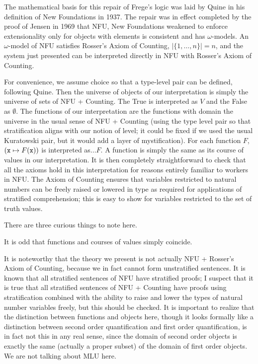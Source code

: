 \documentclass[12pt]{article}
\begin{document}
The mathematical basis for this repair of Frege's logic was laid by Quine in his definition of New Foundations in 1937.  The repair was in effect completed by the proof of Jensen in 1969 that NFU, New Foundations weakened to enforce extensionality only for objects with elements is consistent and has $\omega$-models.  An $\omega$-model of NFU satisfies Rosser's Axiom of Counting, $|\{1,\ldots,n\}| = n$, and the system just
presented can be interpreted directly in NFU with Rosser's Axiom of Counting.

For convenience, we assume choice so that a type-level pair can be defined, following Quine.  Then the universe of objects of our interpretation is simply the universe of sets of NFU + Counting.   The True is interpreted as $V$ and the False as $\emptyset$.  The functions of our interpretation are the functions with domain the universe in the usual sense of NFU + Counting (using the type level pair so that stratification aligns with our notion of level;  it could be fixed if we used the usual Kuratowski pair, but it would add a layer of mystification).
For each function $F$, $({\tt x} \mapsto F({\tt x}))$ is interpreted as...$F$.  A function is simply the same as its course of values in our interpretation.  It is then completely straightforward to check that
all the axioms hold in this interpretation for reasons entirely familiar to workers in NFU.  The Axiom of Counting ensures that variables restricted to natural numbers can be freely raised or lowered in type
as required for applications of stratified comprehension;  this is easy to show for variables restricted to the set of truth values.

There are three curious things to note here.

It is odd that functions and courses of values simply coincide.

It is noteworthy that the theory we present is not actually NFU + Rosser's Axiom of Counting, because we in fact cannot form unstratified sentences.  It is known that all stratified sentences of NFU have stratified proofs;
I suspect that it is true that all stratified sentences of NFU + Counting have proofs using stratification combined with the ability to raise and lower the types of natural number variables freely, but this should be checked.
It is important to realize that the distinction between functions and objects here, though it looks formally like a distinction between second order quantification and first order quantification, is in fact not this in any real sense, since the domain of second order objects is exactly the same (actually a proper subset) of the domain of first order objects.  We are not talking about MLU here.
\end{document}

